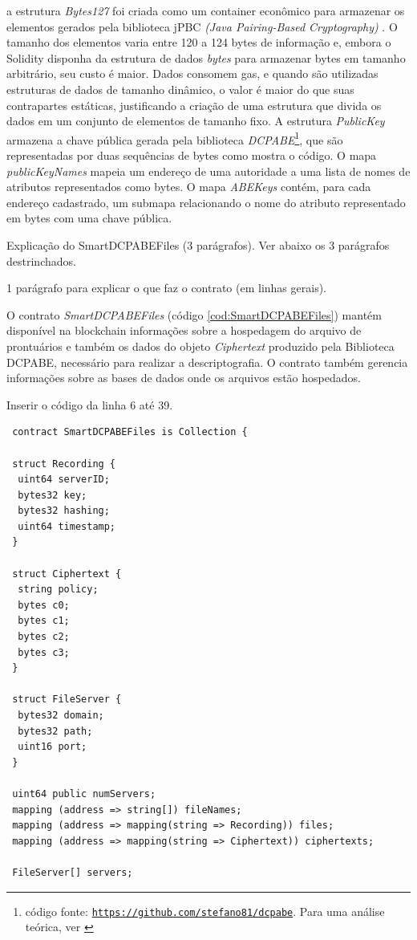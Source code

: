 \documentclass[a4paper,11pt]{article}
\begin{document}
a estrutura \emph{Bytes127} foi criada como um container econômico para armazenar os elementos gerados pela biblioteca jPBC \emph{(Java Pairing-Based Cryptography)} \cite{DeCaro2011}.
O tamanho dos elementos varia entre 120 a 124 bytes de informação e, embora o Solidity disponha da estrutura de dados \emph{bytes} para armazenar bytes em tamanho arbitrário, seu custo é maior.
Dados consomem gas, e quando são utilizadas estruturas de dados de tamanho dinâmico, o valor é maior do que suas contrapartes estáticas, justificando a criação de uma estrutura que divida os dados em um conjunto de elementos de tamanho fixo.
A estrutura \emph{PublicKey} armazena a chave pública gerada pela biblioteca \emph{DCPABE}\footnote{código fonte: \href{https://github.com/stefano81/dcpabe}{\texttt{https://github.com/stefano81/dcpabe}}. Para uma análise teórica, ver \cite{Lewko2011}}, que são representadas por duas sequências de bytes como mostra o código.
O mapa \emph{publicKeyNames} mapeia um endereço de uma autoridade a uma lista de nomes de atributos representados como bytes.
O mapa \emph{ABEKeys} contém, para cada endereço cadastrado, um submapa relacionando o nome do atributo representado em bytes com uma chave pública.

{\color{ForestGreen} Explicação do  SmartDCPABEFiles  (3 parágrafos). Ver abaixo os 3 parágrafos destrinchados.}

{\color{Magenta} 1 parágrafo para explicar o que faz o contrato (em linhas gerais).}

O contrato \emph{SmartDCPABEFiles} (código \ref{cod:SmartDCPABEFiles}) mantém disponível na blockchain informações sobre a hospedagem do arquivo de prontuários e também os dados do objeto \emph{Ciphertext} produzido pela Biblioteca DCPABE, necessário para realizar a descriptografia. O contrato também gerencia informações sobre as bases de dados onde os arquivos estão hospedados.

{\color{Magenta} Inserir o código da linha 6 até 39.}

\begin{lstlisting}
 contract SmartDCPABEFiles is Collection {

 struct Recording {
  uint64 serverID;
  bytes32 key;
  bytes32 hashing;
  uint64 timestamp;
 }

 struct Ciphertext {
  string policy;
  bytes c0;
  bytes c1;
  bytes c2;
  bytes c3;
 }

 struct FileServer {
  bytes32 domain;
  bytes32 path;
  uint16 port;
 }

 uint64 public numServers;
 mapping (address => string[]) fileNames;
 mapping (address => mapping(string => Recording)) files;
 mapping (address => mapping(string => Ciphertext)) ciphertexts;

 FileServer[] servers;
\end{lstlisting}
\end{document}
